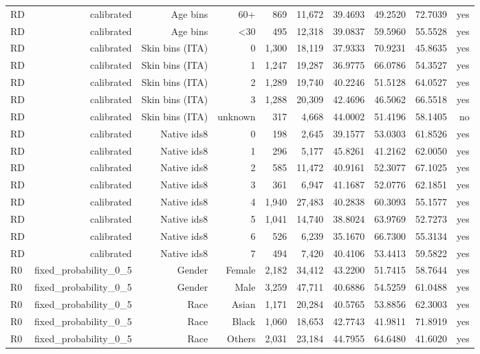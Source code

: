 \documentclass[10pt]{article}
\begin{document}
\begin{longtable}{@{}lrrrrrrrrr@{}}
RD & calibrated & Age bins & 60+ & 869 & 11,672 & 39.4693 & 49.2520 & 72.7039 & yes \\
RD & calibrated & Age bins & \textless{}30 & 495 & 12,318 & 39.0837 & 59.5960 & 55.5528 & yes \\
RD & calibrated & Skin bins (ITA) & 0 & 1,300 & 18,119 & 37.9333 & 70.9231 & 45.8635 & yes \\
RD & calibrated & Skin bins (ITA) & 1 & 1,247 & 19,287 & 36.9775 & 66.0786 & 54.3527 & yes \\
RD & calibrated & Skin bins (ITA) & 2 & 1,289 & 19,740 & 40.2246 & 51.5128 & 64.0527 & yes \\
RD & calibrated & Skin bins (ITA) & 3 & 1,288 & 20,309 & 42.4696 & 46.5062 & 66.5518 & yes \\
RD & calibrated & Skin bins (ITA) & unknown & 317 & 4,668 & 44.0002 & 51.4196 & 58.1405 & no \\
RD & calibrated & Native ids8 & 0 & 198 & 2,645 & 39.1577 & 53.0303 & 61.8526 & yes \\
RD & calibrated & Native ids8 & 1 & 296 & 5,177 & 45.8261 & 41.2162 & 62.0050 & yes \\
RD & calibrated & Native ids8 & 2 & 585 & 11,472 & 40.9161 & 52.3077 & 67.1025 & yes \\
RD & calibrated & Native ids8 & 3 & 361 & 6,947 & 41.1687 & 52.0776 & 62.1851 & yes \\
RD & calibrated & Native ids8 & 4 & 1,940 & 27,483 & 40.2838 & 60.3093 & 55.1577 & yes \\
RD & calibrated & Native ids8 & 5 & 1,041 & 14,740 & 38.8024 & 63.9769 & 52.7273 & yes \\
RD & calibrated & Native ids8 & 6 & 526 & 6,239 & 35.1670 & 66.7300 & 55.3134 & yes \\
RD & calibrated & Native ids8 & 7 & 494 & 7,420 & 40.4106 & 53.4413 & 59.5822 & yes \\
R0 & fixed\_probability\_0\_5 & Gender & Female & 2,182 & 34,412 & 43.2200 & 51.7415 & 58.7644 & yes \\
R0 & fixed\_probability\_0\_5 & Gender & Male & 3,259 & 47,711 & 40.6886 & 54.5259 & 61.0488 & yes \\
R0 & fixed\_probability\_0\_5 & Race & Asian & 1,171 & 20,284 & 40.5765 & 53.8856 & 62.3003 & yes \\
R0 & fixed\_probability\_0\_5 & Race & Black & 1,060 & 18,653 & 42.7743 & 41.9811 & 71.8919 & yes \\
R0 & fixed\_probability\_0\_5 & Race & Others & 2,031 & 23,184 & 44.7955 & 64.6480 & 41.6020 & yes \\

\end{longtable}
\end{document}
